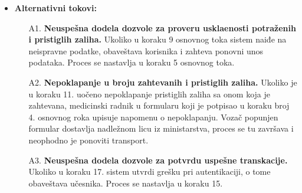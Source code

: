 \documentclass[titlepage]{article}
\begin{document}
\begin{itemize}
\begin{enumerate}
    \item Sistem vr\v{s}i validaciju unetih podataka.
    \item Sistem \v{c}lanu medicinskog osoblja prikazuje stranicu sa informacijama o podnetom zahtevu ( informacije o vremenu podnetog zahteva, zatra\v{z}enim zalihama, povratnoj informaciji, identitetu podnosioca zahteva )
    \item Medicinski radnik utvr\dj{}uje da li se koli\v{c}ina pristiglih zaliha poklapa sa onom koja je zahtevana.
    \item \v{C}lan medicinskog osoblja vr\v{s}i prenos robe u skladi\v{s}te.
    \item Voza\v{c} potpisanu  potvrdu o primljenim zalihama daje nadle\v{z}nom licu za regulisanje zaliha.
    \item Nadle\v{z}no lice otvara stranicu logovanje u svrhu potvrde uspe\v{s}ne transakcije zaliha.
    \item Sistem mu prikazuje stranicu sa formularom sa poljima za ime, prezime, jmbg i specijalni identifikacioni broj.
    \item Nadle\v{z}no lice ministarstva unosi podatke i potvr\dj{}uje unos.
    \item Sistem proverava validnost unetih podataka.
    \item Nadle\v{z}no lice unosi informacije o transakciji zaliha (identifikacioni broj zahteva, identitet de\v{z}urnog \v{c}lana medicinskog osoblja koje je potvrdilo dostavu zatra\v{z}enih zaliha).
    \item Sistem sve informacije o transakciji \v{c}uva i a\v{z}urira podatke vezane za preostale zalihe u odgovaraju\'{c}oj kovid ambulanti.
 \end{enumerate}
 \item \textbf{Alternativni tokovi:}
 \begin{itemize}
            \item[A1.] \textbf{Neuspe\v{s}na dodela dozvole za proveru uskla\dj{}enosti potra\v{z}enih i pristiglih zaliha.} Ukoliko u koraku 9 osnovnog toka sistem naiđe na neispravne podatke, obaveštava korisnika i zahteva ponovni unos podataka. Proces se nastavlja u koraku 5 osnovnog toka.
	\item [A2.] \textbf{Nepoklapanje u broju zahtevanih i pristiglih zaliha.} Ukoliko je u koraku 11. uo\v{c}eno nepoklapanje pristiglih zaliha sa onom koja je zahtevana, medicinski radnik u formularu koji je potpisao u koraku broj 4. osnovnog roka upisuje napomenu o nepoklapanju. Voza\v{c} popunjen formular dostavlja nadle\v{z}nom licu iz ministarstva, proces se tu zavr\v{s}ava i neophodno je ponoviti transport.
            \item[A3.] \textbf{Neuspe\v{s}na dodela dozvole za potvrdu uspe\v{s}ne transkacije.} Ukoliko u koraku 17. sistem utvrdi gre\v{s}ku pri autentikaciji, o tome obave\v{s}tava u\v{c}esnika. Proces se nastavlja u koraku 15. 
        \end{itemize}
\end{itemize}
\end{document}
